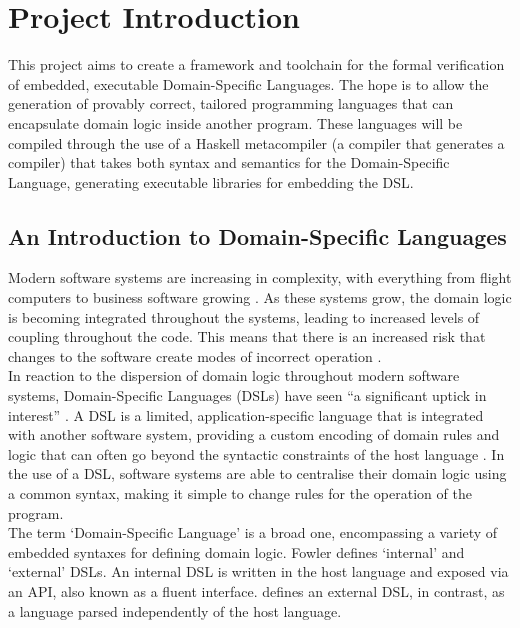 
\chapter{Project Introduction} %
\label{cha:project_introduction}
This project aims to create a framework and toolchain for the formal verification of embedded, executable Domain-Specific Languages.
The hope is to allow the generation of provably correct, tailored programming languages that can encapsulate domain logic inside another program.
These languages will be compiled through the use of a Haskell metacompiler (a compiler that generates a compiler) that takes both syntax and semantics for the Domain-Specific Language, generating executable libraries for embedding the DSL.

\section{An Introduction to Domain-Specific Languages} %
\label{sec:an_introduction_to_domain_specific_languages}
Modern software systems are increasing in complexity, with everything from flight computers to business software growing \citep{dvorak2009nasa}.
As these systems grow, the domain logic is becoming integrated throughout the systems, leading to increased levels of coupling throughout the code.
This means that there is an increased risk that changes to the software create modes of incorrect operation \citep{khawar2001developing}.\\

In reaction to the dispersion of domain logic throughout modern software systems, Domain-Specific Languages (DSLs) have seen ``a significant uptick in interest'' \citep{fowler2010domain}. 
A DSL is a limited, application-specific language that is integrated with another software system, providing a custom encoding of domain rules and logic that can often go beyond the syntactic constraints of the host language \citep{Mernik:2005:DDL:1118890.1118892}.
In the use of a DSL, software systems are able to centralise their domain logic using a common syntax, making it simple to change rules for the operation of the program.\\

The term `Domain-Specific Language' is a broad one, encompassing a variety of embedded syntaxes for defining domain logic.
Fowler defines `internal' and `external' DSLs.
An internal DSL is written in the host language and exposed via an API, also known as a fluent interface.
\cite{fowler2010domain} defines an external DSL, in contrast, as a language parsed independently of the host language.\\

